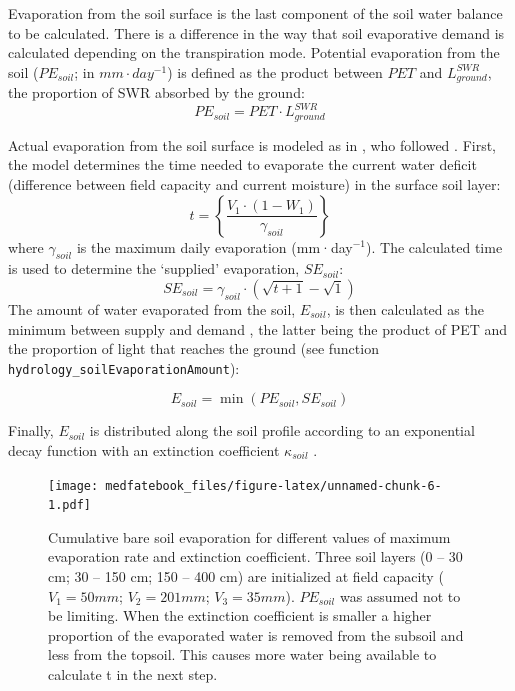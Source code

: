 \documentclass[]{book}
\begin{document}
Evaporation from the soil surface is the last component of the soil water balance to be calculated. There is a difference in the way that soil evaporative demand is calculated depending on the transpiration mode. Potential evaporation from the soil (\(PE_{soil}\); in \(mm\cdot day^{-1}\)) is defined as the product between \(PET\) and \(L^{SWR}_{ground}\), the proportion of SWR absorbed by the ground:
\begin{equation}
PE_{soil} =  PET\cdot L^{SWR}_{ground}
\end{equation}

Actual evaporation from the soil surface is modeled as in \citet{Mouillot2001}, who
followed \citet{Ritchie1972}. First, the model determines the time needed to evaporate
the current water deficit (difference between field capacity and current moisture)
in the surface soil layer:
\begin{equation}
t = \left \{ \frac{V_1\cdot(1- W_1)}{\gamma_{soil}} \right \}
\end{equation}
where \(\gamma_{soil}\) is the maximum daily evaporation (mm·day\(^{-1}\)). The
calculated time is used to determine the `supplied' evaporation, \(SE_{soil}\):
\begin{equation}
SE_{soil} = \gamma_{soil} \cdot (\sqrt{t+1}-\sqrt{1})
\end{equation}
The amount of water evaporated from the soil, \(E_{soil}\), is then calculated as
the minimum between supply and demand \citep{Federer1982}, the latter being the product
of PET and the proportion of light that reaches the ground (see function \texttt{hydrology\_soilEvaporationAmount}):

\begin{equation}
E_{soil} = \min(PE_{soil}, SE_{soil})
\end{equation}

Finally, \(E_{soil}\) is distributed along the soil profile according to an exponential decay function with an extinction coefficient \(\kappa_{soil}\) \citep{Mouillot2001}.

\begin{figure}
\centering
\texttt{[image: medfatebook\_files/figure-latex/unnamed-chunk-6-1.pdf]}
\caption{\label{fig:unnamed-chunk-6}Cumulative bare soil evaporation for different values of maximum evaporation rate and extinction coefficient. Three soil layers (0 -- 30 cm; 30 -- 150 cm; 150 -- 400 cm) are initialized at field capacity (\(V_1 = 50 mm\); \(V_2 = 201 mm\); \(V_3 = 35 mm\)). \(PE_{soil}\) was assumed not to be limiting. When the extinction coefficient is smaller a higher proportion of the evaporated water is removed from the subsoil and less from the topsoil. This causes more water being available to calculate t in the next step.}
\end{figure}
\end{document}
